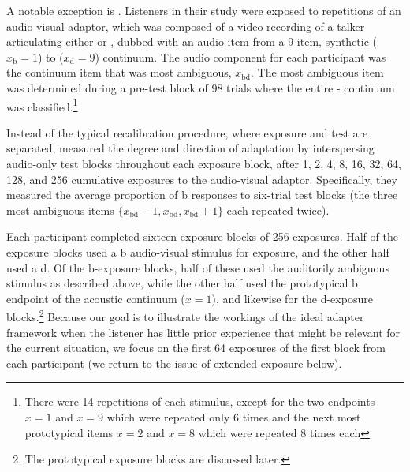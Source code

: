 A notable exception is \textcite{Vroomen2007}.  Listeners in their study were exposed to repetitions of an audio-visual adaptor, which was composed of a video recording of a talker articulating either  or , dubbed with an audio item from a 9-item, synthetic  ($x_\mathrm{b}=1$) to  ($x_\mathrm{d}=9$) continuum.  The audio component for each participant was the continuum item that was most ambiguous, $x_\mathrm{bd}$.  The most ambiguous item was determined during a pre-test block of 98 trials where the entire - continuum was classified.\footnote{There were 14 repetitions of each stimulus, except for the two endpoints $x=1$ and $x=9$ which were repeated only 6 times and the next most prototypical items $x=2$ and $x=8$ which were repeated 8 times each}

Instead of the typical recalibration procedure, where exposure and test are separated, \textcite{Vroomen2007} measured the degree and direction of adaptation by interspersing audio-only test blocks throughout each exposure block, after 1, 2, 4, 8, 16, 32, 64, 128, and 256 cumulative exposures to the audio-visual adaptor.  Specifically, they measured the average proportion of \ph b responses to six-trial test blocks (the three most ambiguous items $\{x_\mathrm{bd}-1, x_\mathrm{bd}, x_\mathrm{bd}+1\}$ each repeated twice).

Each participant completed sixteen exposure blocks of 256 exposures.  Half of the exposure blocks used a \ph b audio-visual stimulus for exposure, and the other half used a \ph d.  Of the \ph b-exposure blocks, half of these used the auditorily ambiguous stimulus as described above, while the other half used the prototypical \ph b endpoint of the acoustic continuum ($x=1$), and likewise for the \ph d-exposure blocks.\footnote{The prototypical exposure blocks are discussed later.} %
Because our goal is to illustrate the workings of the ideal adapter framework when the listener has little prior experience that might be relevant for the current situation, we focus on the first 64 exposures of the first block from each participant (we return to the issue of extended exposure below).

